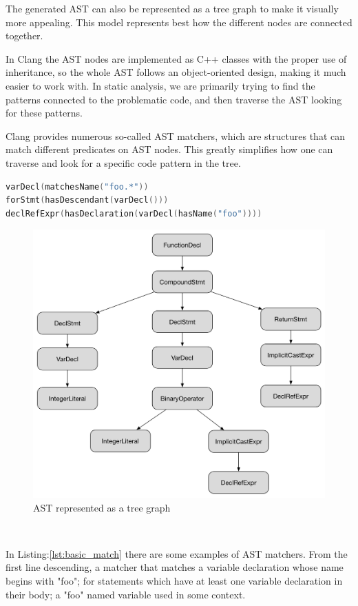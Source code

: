 \par The generated AST can also be represented as a tree graph to make it visually more appealing. This model represents best how the different nodes are connected together. \medskip
\par In Clang the AST nodes are implemented as C++ classes with the proper use of inheritance, so the whole AST follows an object-oriented design, making it much easier to work with. In static analysis, we are primarily trying to find the patterns connected to the problematic code, and then traverse the AST looking for these patterns. \medskip
\par Clang provides numerous so-called AST matchers\cite{ast_reference}, which are structures that can match different predicates on AST nodes. This greatly simplifies how one can traverse and look for a specific code pattern in the tree.
\pagebreak
\begin{lstlisting}[language=c++,frame=single, caption={Basic AST matchers}, style=ast, label={lst:basic_match}]
varDecl(matchesName("foo.*"))
forStmt(hasDescendant(varDecl()))
declRefExpr(hasDeclaration(varDecl(hasName("foo"))))
\end{lstlisting}
\begin{figure}[h]
	\centering
	\caption{AST represented as a tree graph}
	\includegraphics[scale = 0.4]{images/ast_diagram}
\end{figure}\
\par In Listing:\ref{lst:basic_match} there are some examples of AST matchers.  From the first line descending, a matcher that matches a variable declaration whose name begins with "foo"; for statements which have at least one variable declaration in their body; a "foo" named variable used in some context.

